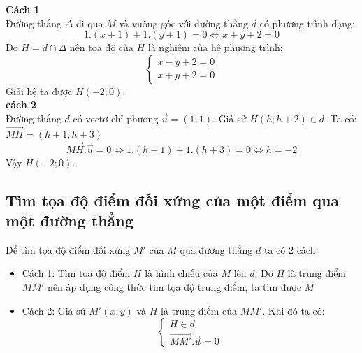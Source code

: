\lgi
\textbf{Cách 1}\\
 Đường thẳng $\Delta$ đi qua $M$ và vuông góc với đường thẳng $d$ có phương trình dạng:
$$1.(x+1)+1.(y+1) = 0 \Leftrightarrow x+y+2=0$$
Do $H = d\cap \Delta$ nên tọa độ của $H$ là nghiệm của hệ phương trình:
$$\begin{cases} x-y+2=0 \\x+y+2=0\end{cases}$$
Giải hệ ta được $H(-2;0)$.\\
\textbf{cách 2}\\
Đường thẳng $d$ có vectơ chỉ phương $\vec{u}=(1;1)$. Giả sử $H(h;h+2) \in d$. Ta có: $\overrightarrow {MH} =(h+1;h+3)$
$$\overrightarrow {MH}. \vec{u} =0 \Leftrightarrow 1.(h+1) + 1.(h+3) = 0 \Leftrightarrow h= -2$$
Vậy $H(-2;0)$.
\subsection{Tìm tọa độ điểm đối xứng của một điểm qua một đường thẳng}
\begin{minipage}{0.55 \textwidth}
Để tìm tọa độ điểm đối xứng $M'$ của $M$ qua đường thẳng $d$ ta có 2 cách:
\begin{itemize}
\item Cách 1: Tìm tọa độ điểm $H$ là hình chiếu của $M$ lên $d$. Do $H$ là trung điểm $MM'$ nên áp dụng công thức tìm tọa độ trung điểm, ta tìm được $M$ 
\item Cách 2: Giả sử $M'(x;y)$ và $H$ là trung điểm của $MM'$. Khi đó ta có:
$$\begin{cases}H \in d \\ \overrightarrow {MM'}. \vec{u} =0 \end{cases}  $$
\end{itemize}
\end{minipage}
